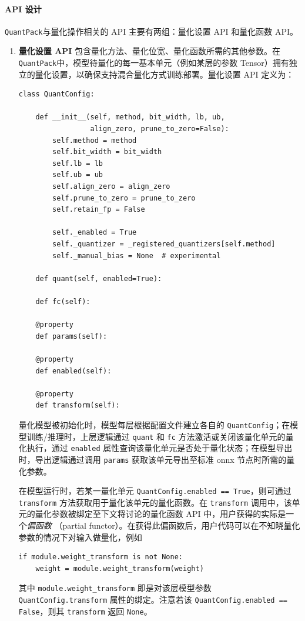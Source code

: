 \documentclass[
  fontset = mac,
]{shtthesis}
\providecommand{\QP}{\texttt{QuantPack}}
\begin{document}
\paragraph{API 设计}
\QP 与量化操作相关的 API 主要有两组：量化设置 API 和量化函数 API。
\begin{enumerate}
  \item \textbf{量化设置 API} 包含量化方法、量化位宽、量化函数所需的其他参数。在 \QP 中，模型待量化的每一基本单元（例如某层的参数 Tensor）拥有独立的量化设置，以确保支持混合量化方式训练部署。量化设置 API 定义为：
    \begin{verbatim}
class QuantConfig:

    def __init__(self, method, bit_width, lb, ub,
                 align_zero, prune_to_zero=False):
        self.method = method
        self.bit_width = bit_width
        self.lb = lb
        self.ub = ub
        self.align_zero = align_zero
        self.prune_to_zero = prune_to_zero
        self.retain_fp = False

        self._enabled = True
        self._quantizer = _registered_quantizers[self.method]
        self._manual_bias = None  # experimental
    
    def quant(self, enabled=True):

    def fc(self):
    
    @property
    def params(self):

    @property
    def enabled(self):

    @property
    def transform(self):
    \end{verbatim}
    量化模型被初始化时，模型每层根据配置文件建立各自的 \verb|QuantConfig|；在模型训练/推理时，上层逻辑通过 \verb|quant| 和 \verb|fc| 方法激活或关闭该量化单元的量化执行，通过 \verb|enabled| 属性查询该量化单元是否处于量化状态；在模型导出时，导出逻辑通过调用 \verb|params| 获取该单元导出至标准 onnx 节点时所需的量化参数。

    在模型运行时，若某一量化单元 \verb|QuantConfig.enabled == True|，则可通过 \verb|transform| 方法获取用于量化该单元的量化函数。在 \verb|transform| 调用中，该单元的量化参数被绑定至下文将讨论的量化函数 API 中，用户获得的实际是一个\emph{偏函数} （partial functor）。在获得此偏函数后，用户代码可以在不知晓量化参数的情况下对输入做量化，例如
    \begin{verbatim}
if module.weight_transform is not None:
    weight = module.weight_transform(weight)
    \end{verbatim}
    其中 \verb|module.weight_transform| 即是对该层模型参数 \verb|QuantConfig.transform| 属性的绑定。注意若该 \verb|QuantConfig.enabled == False|，则其 \verb|transform| 返回 \verb|None|。
  

\end{enumerate}
\end{document}
